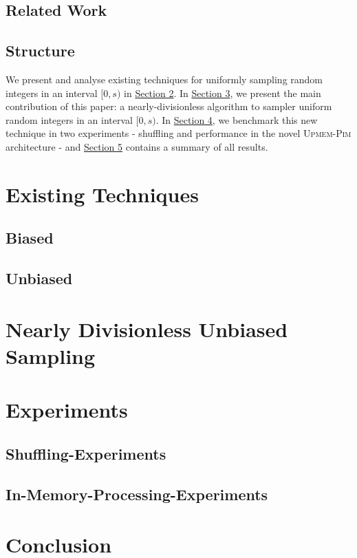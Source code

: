 \documentclass[a4paper, UKenglish, cleveref, autoref, thm-restate]{lipics-v2021}
\begin{document}
\subsection{Related Work}

\subsection{Structure}
We present and analyse existing techniques for uniformly sampling random integers in an interval $[0,s)$ in \hyperref[sec:2]{Section 2}.
In \hyperref[sec:3]{Section 3}, we present the main contribution of this paper: a nearly-divisionless algorithm to sampler uniform random integers in an interval $[0,s)$.
In \hyperref[sec:4]{Section 4}, we benchmark this new technique in two experiments - shuffling and performance in the novel \textsc{Upmem-Pim} architecture - and \hyperref[sec:5]{Section 5} contains a summary of all results.


\section{Existing Techniques}\label{sec:2}
\subsection{Biased}

\subsection{Unbiased}


\section{Nearly Divisionless Unbiased Sampling}\label{sec:3}


\section{Experiments}\label{sec:4}
\subsection{Shuffling-Experiments}

\subsection{In-Memory-Processing-Experiments}


\section{Conclusion}\label{sec:5}





\end{document}
